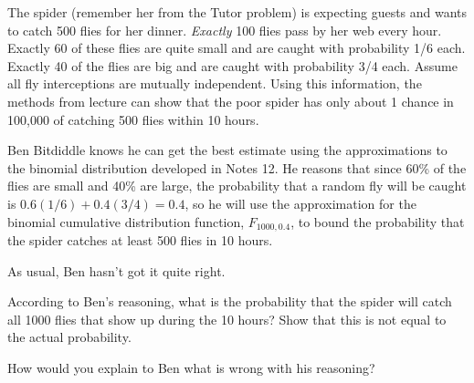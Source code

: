 \documentclass[11pt]{article}
\begin{document}
%

\begin{problem}
The spider (remember her from the Tutor problem) is expecting guests
and wants to catch 500 flies for her dinner.  \emph{Exactly} 100 flies
pass by her web every hour.  Exactly 60 of these flies are quite small
and are caught with probability 1/6 each.  Exactly 40 of the flies are
big and are caught with probability 3/4 each.  Assume all fly
interceptions are mutually independent.  Using this information, the
methods from lecture can show that the poor spider has only about 1
chance in 100,000 of catching 500 flies within 10 hours.

Ben Bitdiddle knows he can get the best estimate using the approximations
to the binomial distribution developed in Notes 12.  He reasons that since
60\% of the flies are small and 40\% are large, the probability that a
random fly will be caught is $0.6(1/6)+0.4(3/4) = 0.4$, so he will use the
approximation for the binomial cumulative distribution function,
$F_{1000,0.4}$, to bound the probability that the spider catches at least
500 flies in 10 hours.

As usual, Ben hasn't got it quite right.

\begin{problemparts}

\problempart According to Ben's reasoning, what is the probability that the
spider will catch all 1000 flies that show up during the 10 hours?  Show
that this is not equal to the actual probability.


\problempart How would you explain to Ben what is wrong with his reasoning?



\end{problemparts}
\end{problem}
\end{document}
